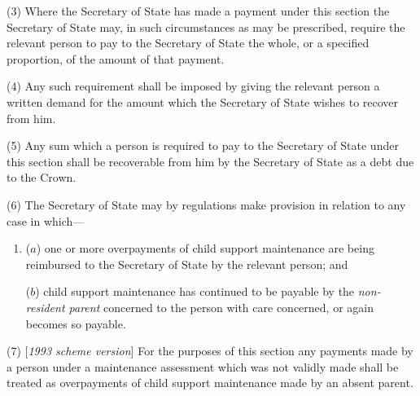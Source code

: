 \documentclass[12pt,a4paper]{article}
\begin{document}
(3) Where the 
Secretary of State  %
has made a payment under this section 
the Secretary of State  %
may, in such circumstances as may be prescribed, require the relevant person to pay to 
the Secretary of State  %
the whole, or a specified proportion, of the amount of that payment.

(4) Any such requirement shall be imposed by giving the relevant person a written demand for the amount which the 
Secretary of State  %
wishes to recover from him.

(5) Any sum which a person is required to pay to the 
Secretary of State  %
under this section shall be recoverable from him by the 
Secretary of State  %
as a debt due to the Crown.

(6) The Secretary of State may by regulations make provision in relation to any case in which—
\begin{enumerate}\item[]
($a$) one or more overpayments of child support maintenance are being reimbursed to the 
Secretary of State  %
by the relevant person; and

($b$) child support maintenance has continued to be payable by the 
\emph{non-resident parent}  %
concerned to the person with care concerned, or again becomes so payable.
\end{enumerate}

(7) [\emph{1993 scheme version}] For the purposes of this section any payments made by a person under a maintenance assessment which was not validly made shall be treated as overpayments of child support maintenance made by an absent parent.
\end{document}
